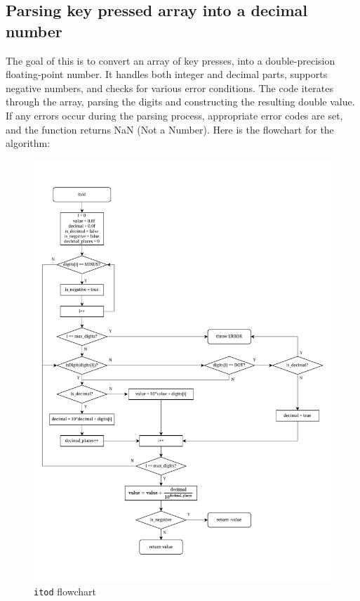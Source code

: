 \documentclass[a4paper, twoside]{report}
\begin{document}
\subsection{Parsing key pressed array into a decimal number}
The goal of this is to convert an array of key presses, into a double-precision floating-point number. It handles both integer and decimal parts, supports negative numbers, and checks for various error conditions. The code iterates through the array, parsing the digits and constructing the resulting double value. If any errors occur during the parsing process, appropriate error codes are set, and the function returns NaN (Not a Number). Here is the flowchart for the algorithm:

\begin{figure}[H]
    \centering
    \includegraphics[height=.8\textheight, trim=0 1.5cm 0 1cm, clip]{images/itod.pdf}
    \caption{\texttt{itod} flowchart}
\end{figure}
\end{document}
